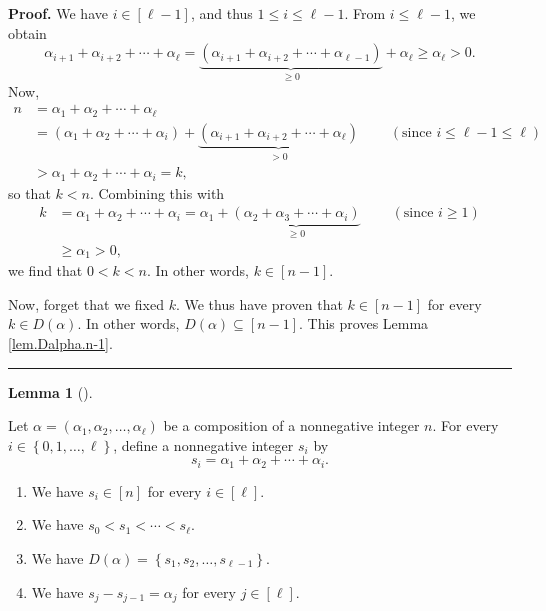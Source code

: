 \documentclass[numbers=enddot,12pt,final,onecolumn,notitlepage,abstracton]{scrartcl}
\theoremstyle{definition}
\newtheorem{lem}[theo]{Lemma}
\newenvironment{lemma}[1][]
{\begin{lem}[#1]\begin{leftbar}}
{\end{leftbar}\end{lem}}
\newenvironment{proof}[1][Proof]{\noindent\textbf{#1.} }{\ \rule{0.5em}{0.5em}}
\newenvironment{verlong}{}{}
\begin{document}
\begin{verlong}
\begin{footnotesize}
\begin{proof}
We have $i\in\left[  \ell-1\right]  $, and thus $1\leq i\leq\ell-1$. From
$i\leq\ell-1$, we obtain%
\[
\alpha_{i+1}+\alpha_{i+2}+\cdots+\alpha_{\ell}=\underbrace{\left(
\alpha_{i+1}+\alpha_{i+2}+\cdots+\alpha_{\ell-1}\right)  }_{\geq0}%
+\alpha_{\ell}\geq\alpha_{\ell}>0.
\]
Now,%
\begin{align*}
n  &  =\alpha_{1}+\alpha_{2}+\cdots+\alpha_{\ell}\\
&  =\left(  \alpha_{1}+\alpha_{2}+\cdots+\alpha_{i}\right)
+\underbrace{\left(  \alpha_{i+1}+\alpha_{i+2}+\cdots+\alpha_{\ell}\right)
}_{>0}\ \ \ \ \ \ \ \ \ \ \left(  \text{since }i\leq\ell-1\leq\ell\right) \\
&  >\alpha_{1}+\alpha_{2}+\cdots+\alpha_{i}=k,
\end{align*}
so that $k<n$. Combining this with%
\begin{align*}
k  &  =\alpha_{1}+\alpha_{2}+\cdots+\alpha_{i}=\alpha_{1}+\underbrace{\left(
\alpha_{2}+\alpha_{3}+\cdots+\alpha_{i}\right)  }_{\geq0}%
\ \ \ \ \ \ \ \ \ \ \left(  \text{since }i\geq1\right) \\
&  \geq\alpha_{1}>0,
\end{align*}
we find that $0<k<n$. In other words, $k\in\left[  n-1\right]  $.

Now, forget that we fixed $k$. We thus have proven that $k\in\left[
n-1\right]  $ for every $k\in D\left(  \alpha\right)  $. In other words,
$D\left(  \alpha\right)  \subseteq\left[  n-1\right]  $. This proves Lemma
\ref{lem.Dalpha.n-1}.
\end{proof}

\begin{lemma}
\label{lem.Dalpha.s}Let $\alpha=\left(  \alpha_{1},\alpha_{2},\ldots
,\alpha_{\ell}\right)  $ be a composition of a nonnegative integer $n$. For
every $i\in\left\{  0,1,\ldots,\ell\right\}  $, define a nonnegative integer
$s_{i}$ by
\[
s_{i}=\alpha_{1}+\alpha_{2}+\cdots+\alpha_{i}.
\]


\begin{enumerate}
\item[(a)] We have $s_{i}\in\left[  n\right]  $ for every $i\in\left[
\ell\right]  $.

\item[(b)] We have $s_{0}<s_{1}<\cdots<s_{\ell}$.

\item[(c)] We have $D\left(  \alpha\right)  =\left\{  s_{1},s_{2}%
,\ldots,s_{\ell-1}\right\}  $.

\item[(d)] We have $s_{j}-s_{j-1}=\alpha_{j}$ for every $j\in\left[
\ell\right]  $.


\end{enumerate}
\end{lemma}
\end{footnotesize}
\end{verlong}
\end{document}
